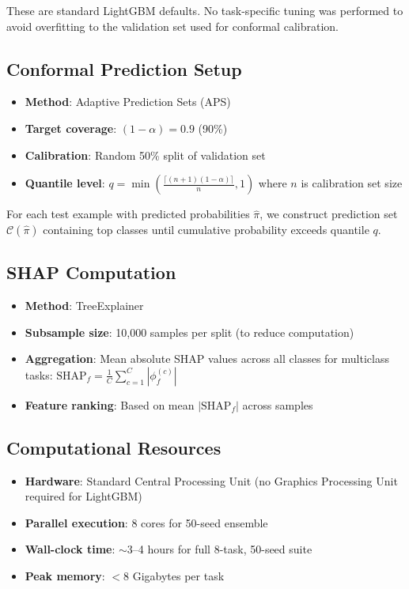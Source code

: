 \documentclass[sigconf]{acmart}
\begin{document}
These are standard LightGBM defaults. No task-specific tuning was performed to
avoid overfitting to the validation set used for conformal calibration.

\subsection{Conformal Prediction Setup}

\begin{itemize}
    \item \textbf{Method}: Adaptive Prediction Sets (APS)~\cite{romano2020classification}
    \item \textbf{Target coverage}: $(1-\alpha) = 0.9$ (90\%)
    \item \textbf{Calibration}: Random 50\% split of validation set
    \item \textbf{Quantile level}: $q = \min\left(\frac{\lceil(n+1)(1-\alpha)\rceil}{n}, 1\right)$
    where $n$ is calibration set size
\end{itemize}

For each test example with predicted probabilities $\hat{\pi}$, we construct
prediction set $\mathcal{C}(\hat{\pi})$ containing top classes until cumulative
probability exceeds quantile $q$.

\subsection{SHAP Computation}

\begin{itemize}
    \item \textbf{Method}: TreeExplainer~\cite{lundberg2020local}
    \item \textbf{Subsample size}: 10,000 samples per split (to reduce computation)
    \item \textbf{Aggregation}: Mean absolute SHAP values across all classes for
    multiclass tasks: $\text{SHAP}_f = \frac{1}{C} \sum_{c=1}^C |\phi_f^{(c)}|$
    \item \textbf{Feature ranking}: Based on mean $|\text{SHAP}_f|$ across samples
\end{itemize}

\subsection{Computational Resources}

\begin{itemize}
    \item \textbf{Hardware}: Standard Central Processing Unit (no Graphics Processing Unit required for LightGBM)
    \item \textbf{Parallel execution}: 8 cores for 50-seed ensemble
    \item \textbf{Wall-clock time}: $\sim$3--4 hours for full 8-task, 50-seed suite
    \item \textbf{Peak memory}: $<$8 Gigabytes per task
\end{itemize}
\end{document}
